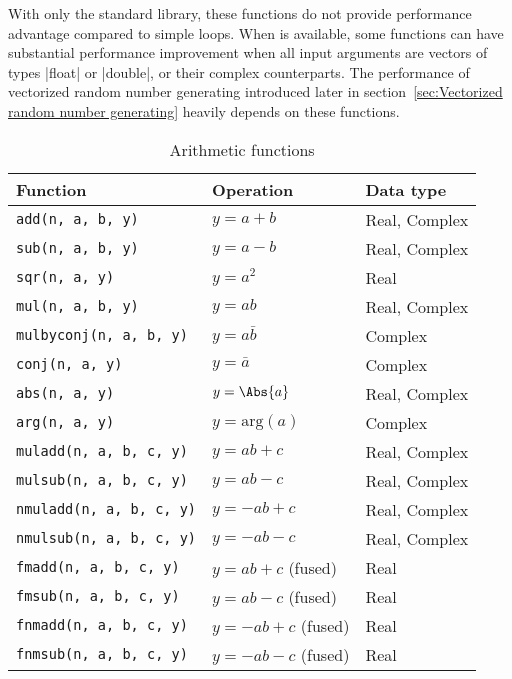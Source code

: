 With only the standard library, these functions do not provide performance
advantage compared to simple loops. When \mkl \vml is available, some functions
can have substantial performance improvement when all input arguments are
vectors of types |float| or |double|, or their complex counterparts. The
performance of vectorized random number generating introduced later in
section~\ref{sec:Vectorized random number generating} heavily depends on these
functions.

\begin{table}
  \begin{tabularx}{\textwidth}{LLL}
    \toprule
    Function & Operation & Data type \\
    \midrule
    \texttt{add(n, a, b, y)}        & $y = a + b$           & Real, Complex \\
    \texttt{sub(n, a, b, y)}        & $y = a - b$           & Real, Complex \\
    \texttt{sqr(n, a, y)}           & $y = a^2$             & Real          \\
    \texttt{mul(n, a, b, y)}        & $y = ab$              & Real, Complex \\
    \texttt{mulbyconj(n, a, b, y)}  & $y = a\bar{b}$        & Complex       \\
    \texttt{conj(n, a, y)}          & $y = \bar{a}$         & Complex       \\
    \texttt{abs(n, a, y)}           & $y = \Abs{a}$         & Real, Complex \\
    \texttt{arg(n, a, y)}           & $y = \mathrm{arg}(a)$ & Complex       \\
    \texttt{muladd(n, a, b, c, y)}  & $y = ab + c$          & Real, Complex \\
    \texttt{mulsub(n, a, b, c, y)}  & $y = ab - c$          & Real, Complex \\
    \texttt{nmuladd(n, a, b, c, y)} & $y = -ab + c$         & Real, Complex \\
    \texttt{nmulsub(n, a, b, c, y)} & $y = -ab - c$         & Real, Complex \\
    \texttt{fmadd(n, a, b, c, y)}   & $y = ab + c$ (fused)  & Real          \\
    \texttt{fmsub(n, a, b, c, y)}   & $y = ab - c$ (fused)  & Real          \\
    \texttt{fnmadd(n, a, b, c, y)}  & $y = -ab + c$ (fused) & Real          \\
    \texttt{fnmsub(n, a, b, c, y)}  & $y = -ab - c$ (fused) & Real          \\
    \bottomrule
  \end{tabularx}
  \caption{Arithmetic functions}
  \label{tab:Arithmetic functions}
\end{table}

